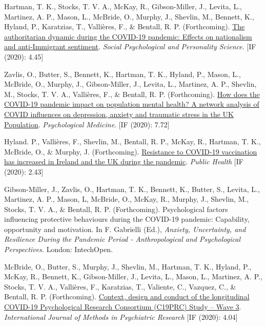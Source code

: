 \documentclass[12pt]{article}
\begin{document}
\begin{bibenum}
	\item Hartman, T. K.,  Stocks, T. V. A., McKay, R., Gibson-Miller, J., Levita, L., 
	Martinez, A. P., Mason, L., McBride, O., Murphy, J., Shevlin, M., Bennett, K., 
	Hyland, P., Karatzias, T., Vallières, F., \& Bentall, R. P. (Forthcoming). 
		\href{https://doi.org/10.1177/1948550620978023}{The authoritarian 
		dynamic during the COVID-19 pandemic: Effects on nationalism and 
		anti-Immigrant sentiment}.
		\emph{Social Psychological and Personality Science}. [IF (2020): 4.45]
	
	\item Zavlis, O., Butter, S., Bennett, K., Hartman, T. K., Hyland, P., 
	Mason, L., McBride, O., Murphy, J., Gibson-Miller, J., Levita, L., 
	Martinez, A. P., Shevlin, M., Stocks, T. V. A., Vallières, F., 
	\& Bentall, R. P. (Forthcoming). 
		\href{https://doi.org/10.1017/S0033291721000635}{How does the COVID-19 
		pandemic impact on population mental health? A network analysis of 
		COVID influences on depression, anxiety and traumatic stress in the 
		UK Population}.
		\emph{Psychological Medicine}. [IF (2020): 7.72]
	
	\item Hyland. P., Vallières, F., Shevlin, M.,  Bentall, R. P., McKay, R., 
	Hartman, T. K., McBride, O., \& Murphy, J. (Forthcoming). 
		\href{https://doi.org/10.1016/j.puhe.2021.04.009}{Resistance to 
		COVID-19 vaccination has increased in Ireland and the UK during the pandemic}.
		\emph{Public Health} [IF (2020): 2.43]
	
	\item Gibson-Miller, J., Zavlis, O., Hartman, T. K., Bennett, K., Butter, S., 
	Levita, L., Martinez, A. P., Mason, L, McBride, O., McKay, R., Murphy, J., 
	Shevlin, M., Stocks, T. V. A., \& Bentall, R. P. (Forthcoming). 
		Psychological factors influencing protective behaviours during 
		the COVID-19 pandemic: Capability, opportunity and motivation. 
		In F. Gabrielli (Ed.), \textit{Anxiety, Uncertainty, and Resilience 
		During the Pandemic Period - Anthropological and Psychological 
		Perspectives.} London: IntechOpen.
	
	\item McBride, O., Butter, S., Murphy, J., Shevlin, M., Hartman, T. K., 
	Hyland, P., McKay, R., Bennett, K., Gibson-Miller, J.,  Levita, L., Mason, L., 
	Martinez, A. P.,  Stocks, T. V. A., Vallières, F., Karatzias, T., Valiente, C., 
	Vazquez, C., \& Bentall, R. P.  (Forthcoming). 
		\href{https://psyarxiv.com/kthfn/}{Context, design and conduct of 
		the longitudinal COVID-19 Psychological Research Consortium 
		(C19PRC) Study – Wave 3}.  
		\emph{International Journal of Methods in Psychiatric Research} [IF (2020): 4.04]
		

\end{bibenum}
\end{document}
